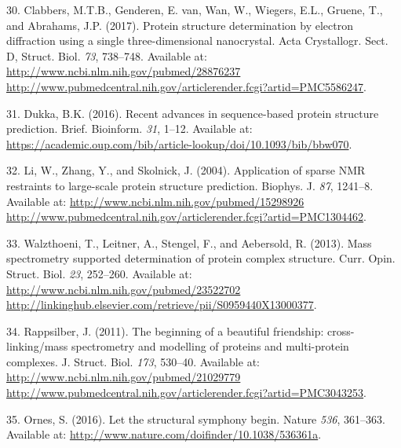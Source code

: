 \documentclass[11pt,a4paper,twoside]{book}
\theoremstyle{definition}
\theoremstyle{definition}
\theoremstyle{remark}
\begin{document}
\hypertarget{ref-Clabbers2017}{}
30. Clabbers, M.T.B., Genderen, E. van, Wan, W., Wiegers, E.L., Gruene,
T., and Abrahams, J.P. (2017). Protein structure determination by
electron diffraction using a single three-dimensional nanocrystal. Acta
Crystallogr. Sect. D, Struct. Biol. \emph{73}, 738--748. Available at:
\href{http://www.ncbi.nlm.nih.gov/pubmed/28876237\%20http://www.pubmedcentral.nih.gov/articlerender.fcgi?artid=PMC5586247}{http://www.ncbi.nlm.nih.gov/pubmed/28876237 http://www.pubmedcentral.nih.gov/articlerender.fcgi?artid=PMC5586247}.

\hypertarget{ref-BKC2016}{}
31. Dukka, B.K. (2016). Recent advances in sequence-based protein
structure prediction. Brief. Bioinform. \emph{31}, 1--12. Available at:
\url{https://academic.oup.com/bib/article-lookup/doi/10.1093/bib/bbw070}.

\hypertarget{ref-Li2004}{}
32. Li, W., Zhang, Y., and Skolnick, J. (2004). Application of sparse
NMR restraints to large-scale protein structure prediction. Biophys. J.
\emph{87}, 1241--8. Available at:
\href{http://www.ncbi.nlm.nih.gov/pubmed/15298926\%20http://www.pubmedcentral.nih.gov/articlerender.fcgi?artid=PMC1304462}{http://www.ncbi.nlm.nih.gov/pubmed/15298926 http://www.pubmedcentral.nih.gov/articlerender.fcgi?artid=PMC1304462}.

\hypertarget{ref-Walzthoeni2013}{}
33. Walzthoeni, T., Leitner, A., Stengel, F., and Aebersold, R. (2013).
Mass spectrometry supported determination of protein complex structure.
Curr. Opin. Struct. Biol. \emph{23}, 252--260. Available at:
\href{http://www.ncbi.nlm.nih.gov/pubmed/23522702\%20http://linkinghub.elsevier.com/retrieve/pii/S0959440X13000377}{http://www.ncbi.nlm.nih.gov/pubmed/23522702 http://linkinghub.elsevier.com/retrieve/pii/S0959440X13000377}.

\hypertarget{ref-Rappsilber2011}{}
34. Rappsilber, J. (2011). The beginning of a beautiful friendship:
cross-linking/mass spectrometry and modelling of proteins and
multi-protein complexes. J. Struct. Biol. \emph{173}, 530--40. Available
at:
\href{http://www.ncbi.nlm.nih.gov/pubmed/21029779\%20http://www.pubmedcentral.nih.gov/articlerender.fcgi?artid=PMC3043253}{http://www.ncbi.nlm.nih.gov/pubmed/21029779 http://www.pubmedcentral.nih.gov/articlerender.fcgi?artid=PMC3043253}.

\hypertarget{ref-Ornes2016}{}
35. Ornes, S. (2016). Let the structural symphony begin. Nature
\emph{536}, 361--363. Available at:
\url{http://www.nature.com/doifinder/10.1038/536361a}.
\end{document}
